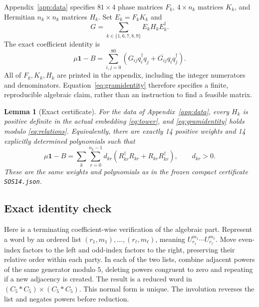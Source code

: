 \documentclass[11pt,a4paper]{article}
\numberwithin{equation}{section}
\newtheorem{lemma}[theorem]{Lemma}
\theoremstyle{remark}\newtheorem{remark}[theorem]{Remark}
\newcommand{\id}{\mathbf 1}
\newcommand{\adj}{\dagger}
\begin{document}
Appendix~\ref{app:data} specifies $81\times4$ phase matrices $F_k$,
$4\times n_k$ matrices $K_k$, and Hermitian $n_k\times n_k$ matrices $H_k$.
Set $E_k=F_kK_k$ and
\begin{equation}\label{eq:gram}
 G=\sum_{k\in\{1,6,7,8,9\}}E_kH_kE_k^\adj.
\end{equation}
The exact coefficient identity is
\begin{equation}\label{eq:gramidentity}
 \mu\id-B=\sum_{i,j=0}^{80}
 \left(G_{ij}q_i^\adj q_j+\overline{G_{ij}}q_iq_j^\adj\right).
\end{equation}
All of $F_k,K_k,H_k$ are printed in the appendix, including the integer
numerators and denominators. Equation~\eqref{eq:gramidentity} therefore
specifies a finite, reproducible algebraic claim, rather than an instruction
to find a feasible matrix.

\begin{lemma}[Exact certificate]\label{lem:certificate}
For the data of Appendix~\ref{app:data}, every $H_k$ is positive definite in
the actual embedding \eqref{eq:tower}, and \eqref{eq:gramidentity} holds
modulo \eqref{eq:relations}. Equivalently, there are exactly 14 positive
weights and 14 explicitly determined polynomials such that
\begin{equation}\label{eq:sos}
 \mu\id-B=\sum_{k}\sum_{r=0}^{n_k-1}d_{kr}
 (R_{kr}^\adj R_{kr}+R_{kr}R_{kr}^\adj),\qquad d_{kr}>0.
\end{equation}
These are the same weights and polynomials as in the frozen compact
certificate \texttt{SOS14.json}.
\end{lemma}

\subsection{Exact identity check}\label{sec:identity}
Here is a terminating coefficient-wise verification of the algebraic part.
Represent a word by an ordered list $(r_1,m_1),\ldots,(r_\ell,m_\ell)$,
meaning $U_{r_1}^{m_1}\cdots U_{r_\ell}^{m_\ell}$. Move even-index factors
to the left and odd-index factors to the right, preserving their relative
order within each party. In each of the two lists, combine adjacent powers
of the same generator modulo $5$, deleting powers congruent to zero and
repeating if a new adjacency is created. The result is a reduced word in
$(C_5*C_5)\times(C_5*C_5)$. This normal form is unique. The involution
reverses the list and negates powers before reduction.
\end{document}
